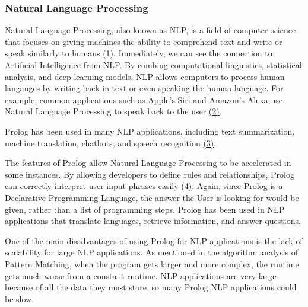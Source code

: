 \documentclass{article}
\theoremstyle{theorem}
\theoremstyle{definition}
\theoremstyle{remark}
\begin{document}
\subsubsection{Natural Language Processing}
\noindent\newline Natural Language Processing, also known as NLP, is a field of computer science that focuses on giving machines the ability to comprehend text and write or speak similarly to humans \href{https://www.ibm.com/topics/natural-language-processing}{(1)}. Immediately, we  can see the connection to Artificial Intelligence from NLP. By combing computational linguistics, statistical analysis, and deep learning models, NLP allows computers to process human langauges by writing back in text or even speaking the human language. For example, common applications such as Apple's Siri and Amazon's Alexa use Natural Language Processing to speak back to the user \href{https://www.arm.com/glossary/natural-language-processing}{(2)}.

\noindent\newline Prolog has been used in many NLP applications, including text summarization, machine translation, chatbots, and speech recognition \href{https://monkeylearn.com/blog/natural-language-processing-applications/}{(3)}.

\noindent\newline The features of Prolog allow Natural Language Processing to be accelerated in some instances. By allowing developers to define rules and relationships, Prolog can correctly interpret user input phrases easily \href{https://www.cs.unm.edu/~luger/ai-final2/CH8_Natural%20Language%20Processing%20in%20Prolog.pdf}{(4)}. Again, since Prolog is a Declarative Programming Language, the answer the User is looking for would be given, rather than a list of programming steps. Prolog has been used in NLP applications that translate languages, retrieve information, and answer questions. 

\noindent\newline One of the main disadvantages of using Prolog for NLP applications is the lack of scalability for large NLP applications. As mentioned in the algorithm analysis of Pattern Matching, when the program gets larger and more complex, the runtime gets much worse from a constant runtime. NLP applications are very large because of all the data they must store, so many Prolog NLP applications could be slow. 
\end{document}

